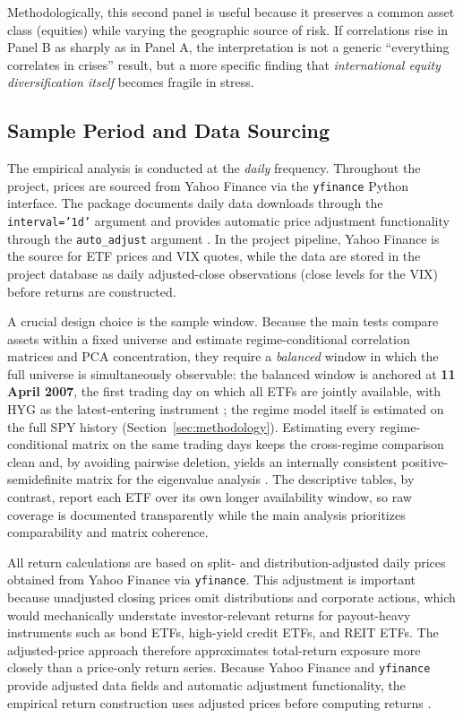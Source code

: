 Methodologically, this second panel is useful because it preserves a common asset class (equities) while varying the geographic source of risk. If correlations rise in Panel B as sharply as in Panel A, the interpretation is not a generic ``everything correlates in crises'' result, but a more specific finding that \emph{international equity diversification itself} becomes fragile in stress.

\subsection{Sample Period and Data Sourcing}
\label{subsec:sample_period}

The empirical analysis is conducted at the \emph{daily} frequency. Throughout the project, prices are sourced from Yahoo Finance via the \texttt{yfinance} Python interface. The package documents daily data downloads through the \texttt{interval='1d'} argument and provides automatic price adjustment functionality through the \texttt{auto\_adjust} argument \citep{yfinance_download_2026}. In the project pipeline, Yahoo Finance is the source for ETF prices and VIX quotes, while the data are stored in the project database as daily adjusted-close observations (close levels for the VIX) before returns are constructed.

A crucial design choice is the sample window. Because the main tests compare assets within a fixed universe and estimate regime-conditional correlation matrices and PCA concentration, they require a \emph{balanced} window in which the full universe is simultaneously observable: the balanced window is anchored at \textbf{11 April 2007}, the first trading day on which all ETFs are jointly available, with HYG as the latest-entering instrument \citep{ishares_hyg_2026}; the regime model itself is estimated on the full SPY history (Section~\ref{sec:methodology}). Estimating every regime-conditional matrix on the same trading days keeps the cross-regime comparison clean and, by avoiding pairwise deletion, yields an internally consistent positive-semidefinite matrix for the eigenvalue analysis \citep{lewis1995pairwise,jolliffe2002pca}. The descriptive tables, by contrast, report each ETF over its own longer availability window, so raw coverage is documented transparently while the main analysis prioritizes comparability and matrix coherence.

All return calculations are based on split- and distribution-adjusted daily prices obtained from Yahoo Finance via \texttt{yfinance}. This adjustment is important because unadjusted closing prices omit distributions and corporate actions, which would mechanically understate investor-relevant returns for payout-heavy instruments such as bond ETFs, high-yield credit ETFs, and REIT ETFs. The adjusted-price approach therefore approximates total-return exposure more closely than a price-only return series. Because Yahoo Finance and \texttt{yfinance} provide adjusted data fields and automatic adjustment functionality, the empirical return construction uses adjusted prices before computing returns \citep{yfinance_download_2026}.

